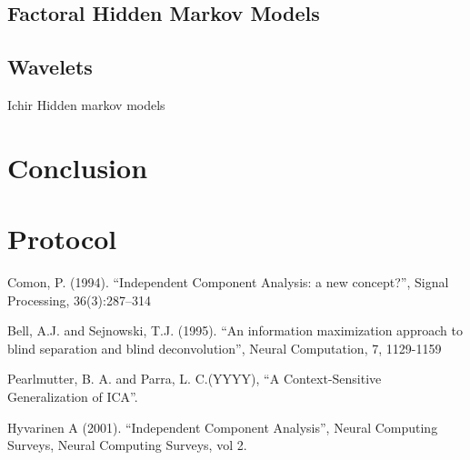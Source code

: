 \documentclass[11pt, oneside, a4paper]{article}
\begin{document}
\subsection{Factoral Hidden Markov Models} %


\subsection{Wavelets} %




Ichir Hidden markov models

\section{Conclusion}

\theappendix

\section{Protocol}


\begin{thebibliography}{99}

 Comon, P. (1994). 
``Independent Component Analysis: a new concept?'', 
Signal Processing, 36(3):287–314

 Bell, A.J. and Sejnowski, T.J. (1995). 
``An information maximization approach to blind separation and blind deconvolution'', 
Neural Computation, 7, 1129-1159

Pearlmutter, B. A. and Parra, L. C.(YYYY),
``A Context-Sensitive Generalization of ICA''. 

Hyvarinen A (2001).
``Independent Component Analysis'',
Neural Computing Surveys, Neural Computing Surveys, vol 2.

  
\end{thebibliography}
\end{document}
